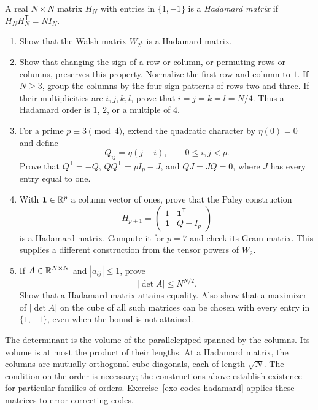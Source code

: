 \begin{exo}
\label{exo-matrices-hadamard}
A real $N\times N$ matrix $H_N$ with entries in $\{1,-1\}$ is a
\emph{Hadamard matrix} if $H_NH_N^{\mathsf T}=NI_N$.
\begin{enumerate}
\item Show that the Walsh matrix $W_{2^k}$ is a Hadamard matrix.
\item Show that changing the sign of a row or column, or permuting rows or
columns, preserves this property. Normalize the first row and column to $1$.
If $N\geq3$, group the columns by the four sign patterns of rows two and
three. If their multiplicities are $i,j,k,l$, prove that
$i=j=k=l=N/4$. Thus a Hadamard order is $1$, $2$, or a multiple of $4$.
\item For a prime $p\equiv3\pmod4$, extend the quadratic character by
$\eta(0)=0$ and define
\[
 Q_{ij}=\eta(j-i),\qquad 0\leq i,j<p.
\]
Prove that $Q^{\mathsf T}=-Q$, $QQ^{\mathsf T}=pI_p-J$, and $QJ=JQ=0$,
where $J$ has every entry equal to one.
\item With $\mathbf1\in\mathbb{R}^p$ a column vector of ones, prove that the
Paley construction
\[
 H_{p+1}=\begin{pmatrix}1&\mathbf1^{\mathsf T}\\
                         \mathbf1&Q-I_p\end{pmatrix}
\]
is a Hadamard matrix. Compute it for $p=7$ and check its Gram matrix.
This supplies a different construction from the tensor powers of $W_2$.
\item If $A\in\mathbb{R}^{N\times N}$ and $|a_{ij}|\leq1$, prove
\begin{equation}
\label{eq-borne-hadamard}
 |\det A|\leq N^{N/2}.
\end{equation}
Show that a Hadamard matrix attains equality. Also show that a maximizer of
$|\det A|$ on the cube of all such matrices can be chosen with every entry
in $\{1,-1\}$, even when the bound is not attained.
\end{enumerate}
The determinant is the volume of the parallelepiped spanned by the columns.
Its volume is at most the product of their lengths. At a Hadamard matrix,
the columns are mutually orthogonal cube diagonals, each of length $\sqrt N$.
The condition on the order is necessary; the constructions above establish
existence for particular families of orders.
Exercise~\ref{exo-codes-hadamard} applies these matrices to error-correcting codes.
\end{exo}

